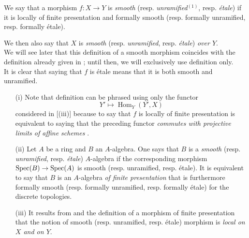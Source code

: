 \begin{definition}[17.3.1]
\label{IV.17.3.1}
We say that a morphism $f : X \to Y$ is \emph{smooth} (resp. \emph{unramified}$^{(1)}$, resp. \emph{\'etale}) %
if it is locally of finite presentation and formally smooth (resp. formally unramified, resp. formally \'etale).
\end{definition}
We then also say that $X$ is \emph{smooth} (resp. \emph{unramified}, resp. \emph{\'etale}) \emph{over $Y$}.\\
We will see later  that this definition of a smooth morphism coincides with the definition already given in ; until then, we will exclusively use definition  only.\\
It is clear that saying that $f$ is \'etale means that it is both smooth and unramified.

\begin{remark}[17.3.2]
\label{IV.17.3.2}
\begin{enumerate}

\item[(i)] Note that definition  can be phrased using only the functor
\[
  Y' \mapsto \operatorname{Hom}_Y(Y', X)
\] considered in [(iii)] because to say that $f$ is locally of finite presentation is equivalent to saying that the preceding functor \emph{commutes with projective limits of affine schemes} .

\item[(ii)] Let $A$ be a ring and $B$ an $A$-algebra. 
One says that $B$ is a \emph{smooth} (resp. \emph{unramified}, resp. \emph{\'etale}) $A$-algebra if the corresponding morphism $\Spec(B) \to \Spec(A)$ is smooth (resp. unramified, resp. \'etale).
It is equivalent to say that $B$ is an $A$-algebra \emph{of finite presentation}  that is furthermore formally smooth (resp. formally unramified, resp. formally \'etale) for the discrete topologies.

\item[(iii)] It results from  and the definition of a morphism of finite presentation  that the notion of smooth (resp. unramified, resp. \'etale) morphism is \emph{local on $X$ and on $Y$}.
\end{enumerate}
\end{remark}

